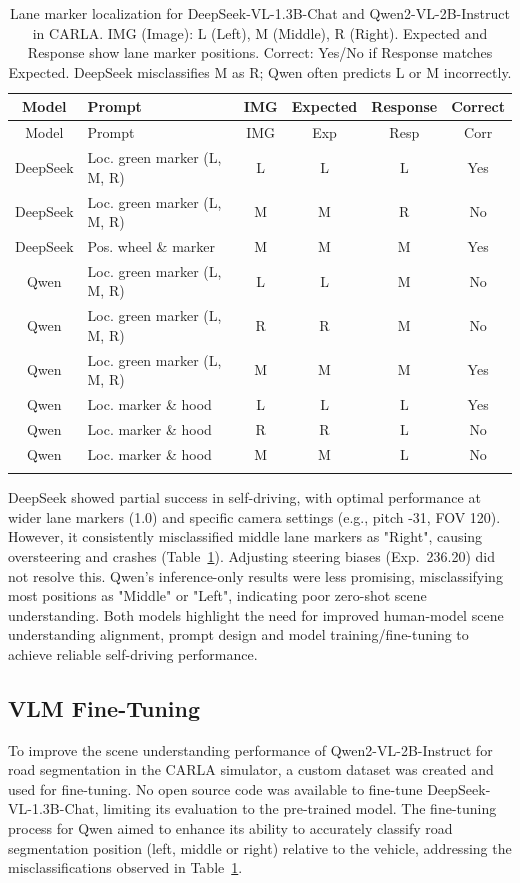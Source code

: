 \begin{longtable}{@{}clcccc@{}}
\toprule
Model & Prompt & IMG & Expected & Response & Correct \\
\midrule
\endfirsthead
\toprule
Model & Prompt & IMG & Exp & Resp & Corr \\
\midrule
\endhead
DeepSeek & Loc. green marker (L, M, R) & L & L & L & Yes \\
DeepSeek & Loc. green marker (L, M, R) & M & M & R & No \\
DeepSeek & Pos. wheel \& marker & M & M & M & Yes \\
Qwen & Loc. green marker (L, M, R) & L & L & M & No \\
Qwen & Loc. green marker (L, M, R) & R & R & M & No \\
Qwen & Loc. green marker (L, M, R) & M & M & M & Yes \\
Qwen & Loc. marker \& hood & L & L & L & Yes \\
Qwen & Loc. marker \& hood & R & R & L & No \\
Qwen & Loc. marker \& hood & M & M & L & No \\
\bottomrule
\caption{Lane marker localization for DeepSeek-VL-1.3B-Chat and Qwen2-VL-2B-Instruct in CARLA. IMG (Image): L (Left), M (Middle), R (Right). Expected and Response show lane marker positions. Correct: Yes/No if Response matches Expected. DeepSeek misclassifies M as R; Qwen often predicts L or M incorrectly.}
\label{tab:prompt_responses}
\end{longtable}

DeepSeek showed partial success in self-driving, with optimal performance at wider lane markers (1.0) and specific camera settings (e.g., pitch -31, FOV 120). However, it consistently misclassified middle lane markers as "Right", causing oversteering and crashes (Table~\ref{tab:prompt_responses}). Adjusting steering biases (Exp.~236.20) did not resolve this. Qwen's inference-only results were less promising, misclassifying most positions as "Middle" or "Left", indicating poor zero-shot scene understanding. Both models highlight the need for improved human-model scene understanding alignment, prompt design and model training/fine-tuning to achieve reliable self-driving performance.

\subsection{VLM Fine-Tuning}
\label{subsec:vlm_finetuning}

To improve the scene understanding performance of Qwen2-VL-2B-Instruct for road segmentation in the CARLA simulator, a custom dataset was created and used for fine-tuning. No open source code was available to fine-tune DeepSeek-VL-1.3B-Chat, limiting its evaluation to the pre-trained model. The fine-tuning process for Qwen aimed to enhance its ability to accurately classify road segmentation position (left, middle or right) relative to the vehicle, addressing the misclassifications observed in Table~\ref{tab:prompt_responses}.

